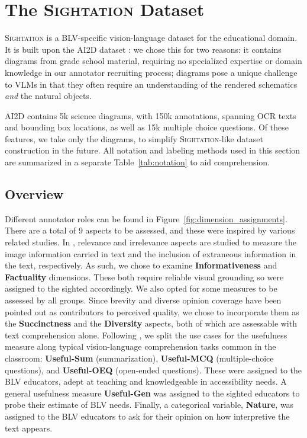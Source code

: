 \section{The \textsc{Sightation} Dataset}\label{sec:sightation}

\textsc{Sightation} is a BLV-specific vision-language dataset for the educational domain. It is built upon the AI2D dataset \citep{kembhavi2016diagram}: we chose this for two reasons: it contains diagrams from grade school material, requiring no specialized expertise or domain knowledge in our annotator recruiting process; diagrams pose a unique challenge to VLMs in that they often require an understanding of the rendered schematics \textit{and} the natural objects.

AI2D contains 5k science diagrams, with 150k annotations, spanning OCR texts and bounding box locations, as well as 15k multiple choice questions. Of these features, we take only the diagrams, to simplify \textsc{Sightation}-like dataset construction in the future. All notation and labeling methods used in this section are summarized in a separate Table~\ref{tab:notation} to aid comprehension.

\subsection{Overview}

Different annotator roles can be found in Figure~\ref{fig:dimension_assignments}. There are a total of 9 aspects to be assessed, and these were inspired by various related studies. In \citet{kreiss2023contextref}, relevance and irrelevance aspects are studied to measure the image information carried in text and the inclusion of extraneous information in the text, respectively. As such, we chose to examine \textbf{Informativeness} and \textbf{Factuality} dimensions. These both require reliable visual grounding so were assigned to the sighted accordingly. We also opted for some measures to be assessed by all groups. Since brevity \citep{9555469} and diverse opinion coverage \citep{glockner-etal-2024-ambifc, nie2020can} have been pointed out as contributors to perceived quality, we chose to incorporate them as the \textbf{Succinctness} and the \textbf{Diversity} aspects, both of which are assessable with text comprehension alone. Following \citet{tang2023vistext}, we split the use cases for the usefulness measure along typical vision-language comprehension tasks common in the classroom: \textbf{Useful-Sum} (summarization), \textbf{Useful-MCQ} (multiple-choice questions), and \textbf{Useful-OEQ} (open-ended questions). These were assigned to the BLV educators, adept at teaching and knowledgeable in accessibility needs. A general usefulness measure \textbf{Useful-Gen} was assigned to the sighted educators to probe their estimate of BLV needs. Finally, a categorical variable, \textbf{Nature}, was assigned to the BLV educators to ask for their opinion on how interpretive the text appears.


